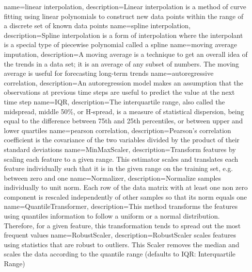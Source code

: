 {
    name={linear interpolation},
    description={Linear interpolation is a method of curve fitting using linear polynomials to construct new data points within the range of a discrete set of known data points}
}
{
    name={spline interpolation},
    description={Spline interpolation is a form of interpolation where the interpolant is a special type of piecewise polynomial called a spline}
}
{
    name={moving average imputation},
    description={A moving average is a technique to get an overall idea of the trends in a data set; it is an average of any subset of numbers. The moving average is useful for forecasting long-term trends}
}
{
    name={autoregressive correlation},
    description={An autoregression model makes an assumption that the observations at previous time steps are useful to predict the value at the next time step}
}
{
    name={IQR},
    description={The interquartile range, also called the midspread, middle 50\%, or H‑spread, is a measure of statistical dispersion, being equal to the difference between 75th and 25th percentiles, or between upper and lower quartiles}
}
{
    name={pearson correlation},
    description={Pearson's correlation coefficient is the covariance of the two variables divided by the product of their standard deviations}
}
{
    name={MinMaxScaler},
    description={Transform features by scaling each feature to a given range. This estimator scales and translates each feature individually such that it is in the given range on the training set, e.g. between zero and one}
}
{
    name={Normalizer},
    description={Normalize samples individually to unit norm. Each row of the data matrix with at least one non zero component is rescaled independently of other samples so that its norm equals one}
}
{
    name={QuantileTransformer},
    description={This method transforms the features using quantiles information to follow a uniform or a normal distribution. Therefore, for a given feature, this transformation tends to spread out the most frequent values}
}
{
    name={RobustScaler},
    description={RobustScaler scales features using statistics that are robust to outliers. This Scaler removes the median and scales the data according to the quantile range (defaults to IQR: Interquartile Range)}
}
